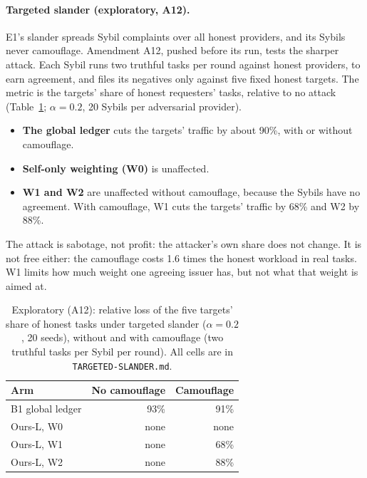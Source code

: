 \paragraph{Targeted slander (exploratory, A12).}
E1's slander spreads Sybil complaints over all honest providers, and its
Sybils never camouflage. Amendment A12, pushed before its run, tests the
sharper attack. Each Sybil runs two truthful tasks per round against
honest providers, to earn agreement, and files its negatives only against
five fixed honest targets. The metric is the targets' share of honest
requesters' tasks, relative to no attack (Table~\ref{tab:target};
$\alpha{=}0.2$, 20 Sybils per adversarial provider).
\begin{itemize}
\item \textbf{The global ledger} cuts the targets' traffic by about 90\%,
  with or without camouflage.
\item \textbf{Self-only weighting (W0)} is unaffected.
\item \textbf{W1 and W2} are unaffected without camouflage, because the
  Sybils have no agreement. With camouflage, W1 cuts the targets' traffic
  by 68\% and W2 by 88\%.
\end{itemize}
The attack is sabotage, not profit: the attacker's own share does not
change. It is not free either: the camouflage costs 1.6 times the honest
workload in real tasks. W1 limits how much weight one agreeing issuer
has, but not what that weight is aimed at.

\begin{table}[t]
\caption{Exploratory (A12): relative loss of the five targets' share of
honest tasks under targeted slander ($\alpha{=}0.2$, 20 seeds), without
and with camouflage (two truthful tasks per Sybil per round). All cells
are in \texttt{TARGETED-SLANDER.md}.}
\label{tab:target}
\small
\begin{tabular}{@{}lrr@{}}
\toprule
Arm & No camouflage & Camouflage \\
\midrule
B1 global ledger & 93\% & 91\% \\
Ours-L, W0 & none & none \\
Ours-L, W1 & none & 68\% \\
Ours-L, W2 & none & 88\% \\
\bottomrule
\end{tabular}
\end{table}

